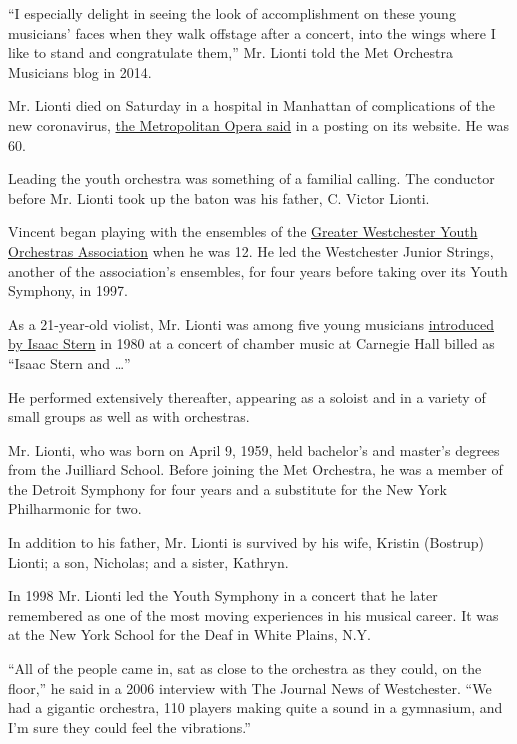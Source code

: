 ``I especially delight in seeing the look of accomplishment on these
young musicians' faces when they walk offstage after a concert, into the
wings where I like to stand and congratulate them,'' Mr. Lionti told the
Met Orchestra Musicians blog in 2014.

Mr. Lionti died on Saturday in a hospital in Manhattan of complications
of the new coronavirus,
\href{https://www.metopera.org/user-information/vincent-lionti/}{the
Metropolitan Opera said} in a posting on its website. He was 60.

Leading the youth orchestra was something of a familial calling. The
conductor before Mr. Lionti took up the baton was his father, C. Victor
Lionti.

Vincent began playing with the ensembles of the
\href{https://www.gwyoa.org/home}{Greater Westchester Youth Orchestras
Association} when he was 12. He led the Westchester Junior Strings,
another of the association's ensembles, for four years before taking
over its Youth Symphony, in 1997.

As a 21-year-old violist, Mr. Lionti was among five young musicians
\href{https://www.nytimes3xbfgragh.onion/1980/11/03/archives/chamber-stern-leads-young-group.html?searchResultPosition=1}{introduced
by Isaac Stern} in 1980 at a concert of chamber music at Carnegie Hall
billed as ``Isaac Stern and \ldots{}''

He performed extensively thereafter, appearing as a soloist and in a
variety of small groups as well as with orchestras.

Mr. Lionti, who was born on April 9, 1959, held bachelor's and master's
degrees from the Juilliard School. Before joining the Met Orchestra, he
was a member of the Detroit Symphony for four years and a substitute for
the New York Philharmonic for two.

In addition to his father, Mr. Lionti is survived by his wife, Kristin
(Bostrup) Lionti; a son, Nicholas; and a sister, Kathryn.

In 1998 Mr. Lionti led the Youth Symphony in a concert that he later
remembered as one of the most moving experiences in his musical career.
It was at the New York School for the Deaf in White Plains, N.Y.

``All of the people came in, sat as close to the orchestra as they
could, on the floor,'' he said in a 2006 interview with The Journal News
of Westchester. ``We had a gigantic orchestra, 110 players making quite
a sound in a gymnasium, and I'm sure they could feel the vibrations.''

